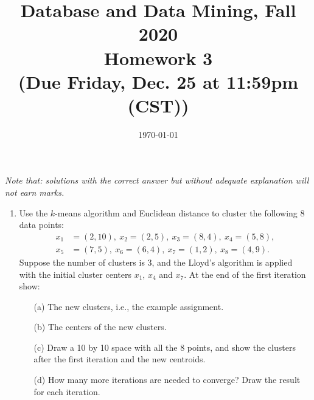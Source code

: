 \documentclass[10pt]{article}
\begin{document}
\date{\today}
\title{Database and Data Mining, Fall 2020 \\
	Homework 3\\
	\small (Due Friday, Dec. 25 at 11:59pm (CST))}
\maketitle

\emph{Note that: solutions with the correct answer but without adequate explanation will not earn marks.}

\begin{enumerate}[1.]

	\item Use the $k$-means algorithm and Euclidean distance to cluster the following 8 data points:
	      \begin{align*}
		      x_1 & = (2,10), \ x_2 = (2,5), \ x_3 = (8,4), \ x_4 = (5,8), \\
		      x_5 & = (7,5),  \ x_6 = (6,4), \ x_7 = (1,2), \ x_8 = (4,9).
	      \end{align*}
	      Suppose the number of clusters is 3, and the Lloyd's algorithm is applied with the initial cluster centers $x_1$, $x_4$ and $x_7$.
	      At the end of the first iteration show:
	      \begin{itemize}
		      \item[(a)] The new clusters, i.e., the example assignment.  ~
		      \item[(b)] The centers of the new clusters. ~
		      \item[(c)] Draw a 10 by 10 space with all the 8 points, and show the clusters after the first iteration and the new centroids. ~
		      \item[(d)] How many more iterations are needed to converge? Draw the result for each iteration. ~
	      \end{itemize}



\end{enumerate}
\end{document}
